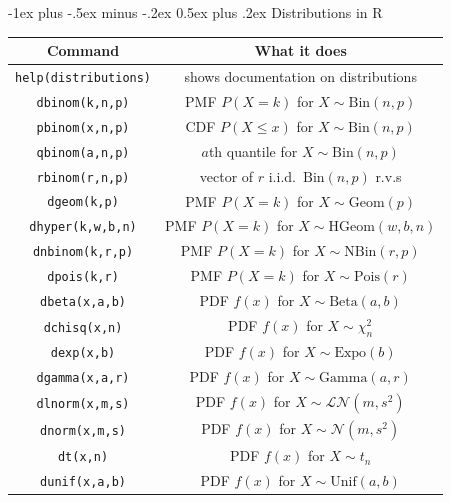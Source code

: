 \documentclass[6pt, landscape]{article}
\makeatletter
\renewcommand{\section}{\@startsection{section}{1}{0mm}%
                                {-1ex plus -.5ex minus -.2ex}%
                                {0.5ex plus .2ex}%
                                {\normalfont\bfseries}}
\renewcommand{\N}{\mathcal{N}}
\newcommand{\Bin}{\textrm{Bin}}
\newcommand{\Beta}{\textrm{Beta}}
\newcommand{\Gam}{\textrm{Gamma}}
\newcommand{\Expo}{\textrm{Expo}}
\newcommand{\Pois}{\textrm{Pois}}
\newcommand{\Unif}{\textrm{Unif}}
\newcommand{\Geom}{\textrm{Geom}}
\newcommand{\NBin}{\textrm{NBin}}
\newcommand{\HGeom}{\textrm{HGeom}}
\makeatother
\begin{document}
\begin{multicols}{3}
        \section{Distributions in R}
        \begin{center}
                \begin{tabular}{cc}
                        \hline
                        \textbf{Command}             & \textbf{What it does}                       \\
                        \hline
                        \texttt{help(distributions)} & shows documentation on distributions        \\
                        \texttt{dbinom(k,n,p)}       & PMF $P(X=k)$ for $X \sim \Bin(n,p)$         \\
                        \texttt{pbinom(x,n,p)}       & CDF $P(X \leq x)$ for $X \sim \Bin(n,p)$    \\
                        \texttt{qbinom(a,n,p)}       & $a$th quantile for $X \sim \Bin(n,p)$       \\
                        \texttt{rbinom(r,n,p)}       & vector of $r$ i.i.d.~$\Bin(n,p)$ r.v.s      \\
                        \texttt{dgeom(k,p)}          & PMF $P(X=k)$ for $X \sim \Geom(p)$          \\
                        \texttt{dhyper(k,w,b,n)}     & PMF $P(X=k)$ for $X \sim \HGeom(w,b,n)$     \\
                        \texttt{dnbinom(k,r,p)}      & PMF $P(X=k)$ for $X \sim \NBin(r,p)$        \\
                        \texttt{dpois(k,r)}          & PMF $P(X=k)$ for $X \sim \Pois(r)$          \\
                        \texttt{dbeta(x,a,b)}        & PDF $f(x)$ for $X \sim \Beta(a,b)$          \\
                        \texttt{dchisq(x,n)}         & PDF $f(x)$ for $X \sim \chi^2_n$            \\
                        \texttt{dexp(x,b)}           & PDF $f(x)$ for $X \sim \Expo(b)$            \\
                        \texttt{dgamma(x,a,r)}       & PDF $f(x)$ for $X \sim \Gam(a,r)$           \\
                        \texttt{dlnorm(x,m,s)}       & PDF $f(x)$ for $X \sim \mathcal{LN}(m,s^2)$ \\
                        \texttt{dnorm(x,m,s)}        & PDF $f(x)$ for $X \sim \N(m,s^2)$           \\
                        \texttt{dt(x,n)}             & PDF $f(x)$ for $X \sim t_n$                 \\
                        \texttt{dunif(x,a,b)}        & PDF $f(x)$ for $X \sim \Unif(a,b)$          \\
                        \hline
                \end{tabular}
        \end{center}

\end{multicols}
\end{document}
